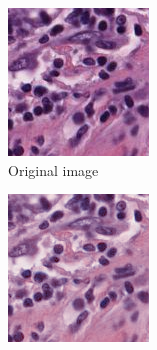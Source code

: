 \begin{figure}[H]
  \centering
  \begin{subfigure}[b]{0.32\textwidth}
    \centering
    \includegraphics[width=\linewidth]{assets/images/for_presentation/image_TCGA-EW-A1P8-01Z-00-DX1.E9852193-8CDD-49EF-B49B-DA6931198F0D_[8391, 13690, 8532, 13838].png}
    \caption{Original image}\label{fig:tiger-raw}
  \end{subfigure}\hfill
  \begin{subfigure}[b]{0.32\textwidth}
    \centering
    \includegraphics[width=\linewidth]{assets/images/for_presentation/norm_TCGA-EW-A1P8-01Z-00-DX1.E9852193-8CDD-49EF-B49B-DA6931198F0D_[8391, 13690, 8532, 13838].png}

\end{subfigure}
\end{figure}
